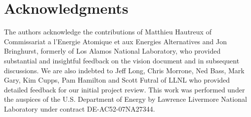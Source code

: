 \section {Acknowledgments}
The authors acknowledge the contributions of Matthieu Hautreux
of Commissariat a l'Energie Atomique et aux Energies Alternatives
and Jon Bringhurst, formerly of Los Alamos National Laboratory, who provided
substantial and insightful feedback on the \flux vision document
and in subsequent discussions.
We are also indebted to 
Jeff Long, Chris Morrone, Ned Bass,
Mark Gary, Kim Cupps, Pam Hamilton and Scott Futral
of LLNL who provided detailed feedback for our initial project review.
This work was performed under the auspices of the U.S. Department
of Energy by Lawrence Livermore National Laboratory under
contract DE-AC52-07NA27344.

